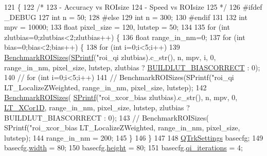 \begin{DoxyCode}
121 \{
122     \textcolor{comment}{/*}
123 \textcolor{comment}{    - Accuracy vs ROIsize}
124 \textcolor{comment}{    - Speed vs ROIsize}
125 \textcolor{comment}{    */}
126 \textcolor{preprocessor}{#ifdef \_DEBUG}
127     \textcolor{keywordtype}{int} n = 50;
128 \textcolor{preprocessor}{#else}
129     \textcolor{keywordtype}{int} n = 300;
130 \textcolor{preprocessor}{#endif}
131 
132     \textcolor{keywordtype}{int} mpv = 10000;
133     \textcolor{keywordtype}{float} pixel\_size = 120, lutstep = 50;
134 
135     \textcolor{keywordflow}{for} (\textcolor{keywordtype}{int} zlutbias=0;zlutbias<2;zlutbias++) \{
136         \textcolor{keywordtype}{float} range\_in\_nm=0;
137         \textcolor{keywordflow}{for} (\textcolor{keywordtype}{int} bias=0;bias<2;bias++) \{
138             \textcolor{keywordflow}{for} (\textcolor{keywordtype}{int} i=0;i<5;i++)
139                 \hyperlink{_benchmark_8cpp_a8467866a7724e472d30414e7ae206c2c}{BenchmarkROISizes}(\hyperlink{utils_8cpp_aba26a6b64035ef7962a63b760dd9013e}{SPrintf}(\textcolor{stringliteral}{"roi\_qi%
      zlutbias).c\_str(), n, mpv, i, 0, range\_in\_nm, pixel\_size, lutstep, zlutbias ? 
      \hyperlink{_queued_tracker_8h_a785877e02de7d5323dbf5d5dff703dbd}{BUILDLUT\_BIASCORRECT} : 0);
140     \textcolor{comment}{//      for (int i=0;i<5;i++)}
141         \textcolor{comment}{//      BenchmarkROISizes(SPrintf("roi\_qi%
       LT\_LocalizeZWeighted, range\_in\_nm, pixel\_size, lutstep);}
142             \hyperlink{_benchmark_8cpp_a8467866a7724e472d30414e7ae206c2c}{BenchmarkROISizes}( \hyperlink{utils_8cpp_aba26a6b64035ef7962a63b760dd9013e}{SPrintf}(\textcolor{stringliteral}{"roi\_xcor\_bias%
      zlutbias).c\_str(), n, mpv, 0, \hyperlink{qtrk__c__api_8h_a9d32512eae44894026802d1a688c7e3ba3c14d24d83bc2358bf41e071861620d2}{LT\_XCor1D}, range\_in\_nm, pixel\_size, lutstep, zlutbias ? 
      BUILDLUT\_BIASCORRECT : 0);
143     \textcolor{comment}{//      BenchmarkROISizes( SPrintf("roi\_xcor\_bias%
       LT\_LocalizeZWeighted, range\_in\_nm, pixel\_size, lutstep);}
144             range\_in\_nm = 200;
145         \}
146     \}
147 
148     \hyperlink{struct_q_trk_settings}{QTrkSettings} basecfg;
149     basecfg.\hyperlink{struct_q_trk_settings_aef24eb3a4692bd67ff1aca8ef950e08d}{width} = 80;
150     basecfg.\hyperlink{struct_q_trk_settings_a94c965d103e7a0a4f1fced8eee1324ce}{height} = 80;
151     basecfg.\hyperlink{struct_q_trk_settings_a12105babb328a9a7ec90f0eab074fabb}{qi\_iterations} = 4;
}}
\end{DoxyCode}
